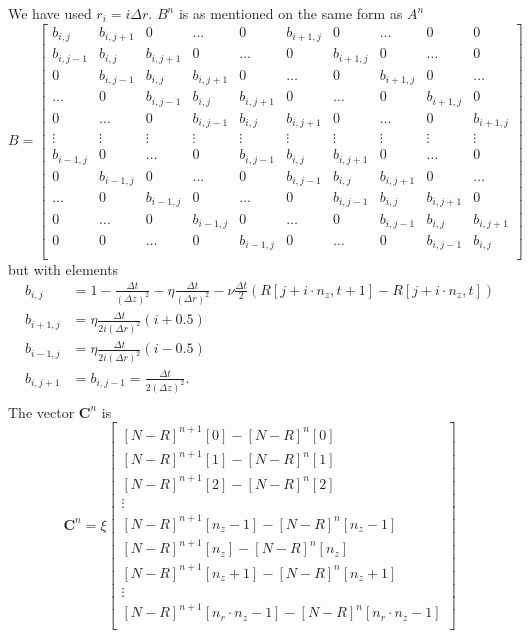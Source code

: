 \documentclass{article}
\begin{document}
We have used $r_i = i \Delta r$. $B^n$ is as mentioned on the same form as $A^n$ 
\begin{equation}
B = 
    \begin{bmatrix}
    b_{i,j} & b_{i,j+1} & 0 & \hdots & 0 & b_{i+1,j} & 0 & \hdots & 0 &  0 \\
    b_{i,j-1} & b_{i,j} & b_{i,j+1} & 0 & \hdots & 0 & b_{i+1,j} & 0 & \hdots & 0 \\
    0 & b_{i,j-1} & b_{i,j} & b_{i,j+1} & 0 & \hdots & 0  & b_{i+1,j} & 0 & \hdots \\
    \hdots & 0 & b_{i,j-1} & b_{i,j} & b_{i,j+1} & 0 & \hdots & 0  & b_{i+1,j} & 0 \\
    0 & \hdots & 0 & b_{i,j-1} & b_{i,j} & b_{i,j+1} & 0 & \hdots & 0  & b_{i+1,j}  \\
    \vdots & \vdots & \vdots &\vdots &\vdots &\vdots &\vdots &\vdots &\vdots &\vdots \\
    b_{i-1,j} & 0 & \hdots & 0 & b_{i,j-1} & b_{i,j} & b_{i,j+1} & 0 & \hdots & 0  \\
    0 & b_{i-1,j} & 0 & \hdots & 0 & b_{i,j-1} & b_{i,j} & b_{i,j+1} & 0 & \hdots \\
    \hdots & 0 & b_{i-1,j} & 0 & \hdots & 0 & b_{i,j-1} & b_{i,j} &  b_{i,j+1} & 0 \\
    0 & \hdots & 0 & b_{i-1,j} & 0 & \hdots & 0 & b_{i,j-1} & b_{i,j} &  b_{i,j+1} \\
    0 & 0 &  \hdots & 0 & b_{i-1,j} & 0 & \hdots & 0 & b_{i,j-1} & b_{i,j} \\
    \end{bmatrix}
\end{equation}
but with elements
\begin{align*}
    b_{i,j} &= 1 - \frac{\Delta t}{(\Delta z)^2} - \eta \frac{\Delta t}{(\Delta r)^2}  - \nu \frac{\Delta t }{2}(R[j + i \cdot n_z,t+1]-R[j + i \cdot n_z,t]) \\
    b_{i+1,j} &=  \eta \frac{\Delta t}{2 i (\Delta r)^2} (i+0.5) \\
    b_{i-1,j} &=  \eta \frac{\Delta t}{2 i (\Delta r)^2} (i-0.5) \\
    b_{i,j+1} &= b_{i,j-1} = \frac{\Delta t }{2 (\Delta z)^2}.\\
\end{align*}
The vector $\boldsymbol{C}^n$ is 
\begin{equation}
\boldsymbol{C}^n = \xi
    \begin{bmatrix}
        [N-R]^{n+1}[0]-[N-R]^{n}[0] \\
        [N-R]^{n+1}[1]-[N-R]^{n}[1] \\
        [N-R]^{n+1}[2]-[N-R]^{n}[2] \\
        \vdots \\
        [N-R]^{n+1}[n_z-1]-[N-R]^{n}[n_z-1] \\
        [N-R]^{n+1}[n_z]-[N-R]^{n}[n_z] \\
        [N-R]^{n+1}[n_z+1]-[N-R]^{n}[n_z+1] \\
        \vdots \\
        [N-R]^{n+1}[n_r \cdot n_z-1]-[N-R]^{n}[n_r \cdot n_z-1] \\
    \end{bmatrix}
\end{equation}
\end{document}

